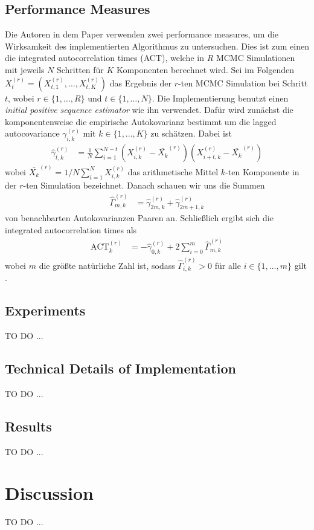 \documentclass{scrartcl}
\begin{document}
    \subsection{Performance Measures}
    Die Autoren in dem Paper \cite{lau2019} verwenden zwei performance measures, um die Wirksamkeit des implementierten
    Algorithmus zu untersuchen. Dies ist zum einen die integrated autocorrelation times (ACT), welche in $R$ MCMC
    Simulationen mit jeweils $N$ Schritten für $K$ Komponenten berechnet wird. Sei im Folgenden
    $X_t^{(r)}=(X_{t,1}^{(r)},\dots,X_{t,K}^{(r)})$ das Ergebnis der $r$-ten MCMC Simulation bei Schritt $t$, wobei
    $r\in\{1,\dots,R\}$ und $t\in\{1,\dots,N\}$. Die Implementierung benutzt einen \textit{initial positive sequence estimator}
    wie ihn \cite{geyer1992} verwendet. Dafür wird zunächst die komponentenweise die empirische Autokovarianz bestimmt um
    die lagged autocovariance $\gamma_{i,k}^{(r)}$ mit $k\in\{1,\dots,K\}$ zu schätzen. Dabei ist
    \begin{align*}
        \hat{\gamma}_{t,k}^{(r)}&=\frac{1}{N}\sum\limits_{i=1}^{N-t}(X_{i,k}^{(r)}-\bar{X_k}^{(r)})(X_{i+t,k}^{(r)}-\bar{X_k}^{(r)})
    \end{align*}
    wobei $\bar{X_k}^{(r)}=1/N\sum\nolimits_{i=1}^NX_{i,k}^{(r)}$ das arithmetische Mittel $k$-ten Komponente in der $r$-ten
    Simulation bezeichnet. Danach schauen wir uns die Summen
    \begin{align*}
        \hat{\Gamma}_{m,k}^{(r)} &= \hat{\gamma}_{2m,k}^{(r)} + \hat{\gamma}_{2m+1,k}^{(r)}
    \end{align*}
    von benachbarten Autokovarianzen Paaren an. Schließlich ergibt sich die integrated autocorrelation times als
    \begin{align*}
        \text{ACT}_k^{(r)}&=-\hat{\gamma}_{0,k}^{(r)}+2\sum\limits_{i=0}^{m}\hat{\Gamma}_{m,k}^{(r)}
    \end{align*}
    wobei $m$ die größte natürliche Zahl ist, sodass $\hat{\Gamma}_{i,k}^{(r)} > 0$ für alle $i\in\{1,\dots,m\}$ gilt
    \cite{geyer1992}.

    \subsection{Experiments}
    TO DO ...

    \subsection{Technical Details of Implementation}
    TO DO ...

    \subsection{Results}
    TO DO ...


    \section{Discussion}
    TO DO ...

    
    
\end{document}
